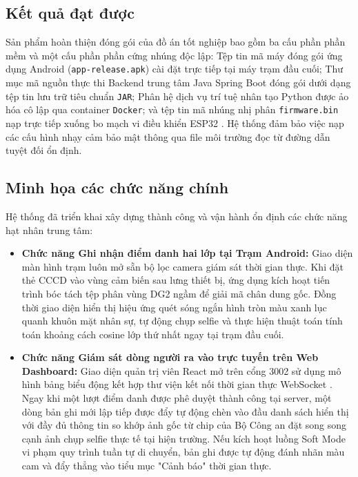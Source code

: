 ﻿\documentclass[../DoAn.tex]{subfiles}
\begin{document}
\subsection{Kết quả đạt được}

Sản phẩm hoàn thiện đóng gói của đồ án tốt nghiệp bao gồm ba cấu phần phần mềm và một cấu phần phần cứng nhúng độc lập: Tệp tin mã máy đóng gói ứng dụng Android (\texttt{app-release.apk}) cài đặt trực tiếp tại máy trạm đầu cuối; Thư mục mã nguồn thực thi Backend trung tâm Java Spring Boot đóng gói dưới dạng tệp tin lưu trữ tiêu chuẩn \texttt{JAR}; Phân hệ dịch vụ trí tuệ nhân tạo Python được ảo hóa cô lập qua container \texttt{Docker}; và tệp tin mã nhúng nhị phân \texttt{firmware.bin} nạp trực tiếp xuống bo mạch vi điều khiển ESP32 \cite{espressif2023}. Hệ thống đảm bảo việc nạp các cấu hình nhạy cảm bảo mật thông qua file môi trường đọc từ đường dẫn tuyệt đối ổn định.

\subsection{Minh họa các chức năng chính}

Hệ thống đã triển khai xây dựng thành công và vận hành ổn định các chức năng hạt nhân trung tâm:
\begin{itemize}
    \item \textbf{Chức năng Ghi nhận điểm danh hai lớp tại Trạm Android:} Giao diện màn hình trạm luôn mở sẵn bộ lọc camera giám sát thời gian thực. Khi đặt thẻ CCCD vào vùng cảm biến sau lưng thiết bị, ứng dụng kích hoạt tiến trình bóc tách tệp phân vùng DG2 ngầm để giải mã chân dung gốc. Đồng thời giao diện hiển thị hiệu ứng quét sóng ngắn hình tròn màu xanh lục quanh khuôn mặt nhân sự, tự động chụp selfie và thực hiện thuật toán tính toán khoảng cách cosine lớp thứ nhất ngay tại trạm đầu cuối.
    \item \textbf{Chức năng Giám sát dòng người ra vào trực tuyến trên Web Dashboard:} Giao diện quản trị viên React mở trên cổng 3002 sử dụng mô hình bảng biểu động kết hợp thư viện kết nối thời gian thực WebSocket \cite{react18}. Ngay khi một lượt điểm danh được phê duyệt thành công tại server, một dòng bản ghi mới lập tiếp được đẩy tự động chèn vào đầu danh sách hiển thị với đầy đủ thông tin so khớp ảnh gốc từ chip của Bộ Công an đặt song song cạnh ảnh chụp selfie thực tế tại hiện trường. Nếu kích hoạt luồng Soft Mode vi phạm quy trình tuần tự di chuyển, bản ghi được tự động đánh nhãn màu cam và đẩy thẳng vào tiểu mục "Cảnh báo" thời gian thực.
\end{itemize}
\end{document}
